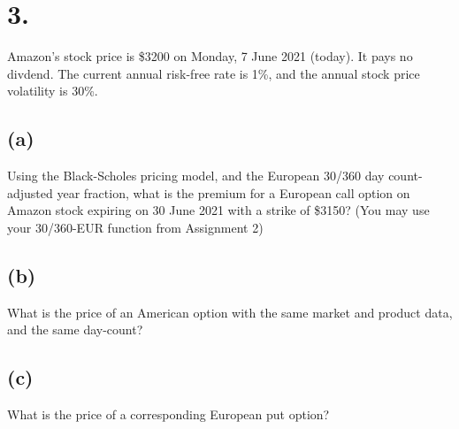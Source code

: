 \documentclass{article}
\begin{document}
\section*{3.}
{\Large 


Amazon's stock price is \$3200 on Monday, 7 June 2021 (today). It pays no divdend. The current annual risk-free rate is 1\%, and the annual stock price volatility is 30\%.

\subsection*{(a)}

Using the Black-Scholes pricing model, and the European 30/360 day count-adjusted year fraction, what is the premium for a European call option on Amazon stock expiring on 30 June 2021 with a strike of \$3150? (You may use your 30/360-EUR function from Assignment 2)

\subsection*{(b)}

What is the price of an American option with the same market and product data, and the same day-count?

\subsection*{(c)}

What is the price of a corresponding European put option?



\newpage
}
\end{document}
